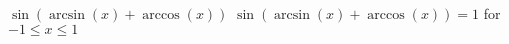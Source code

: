  {$\sin \left( \arcsin(x) + \arccos(x) \right)$ }
{ $\sin \left( \arcsin(x) + \arccos(x) \right) = 1$ for $-1 \leq x \leq 1$}
